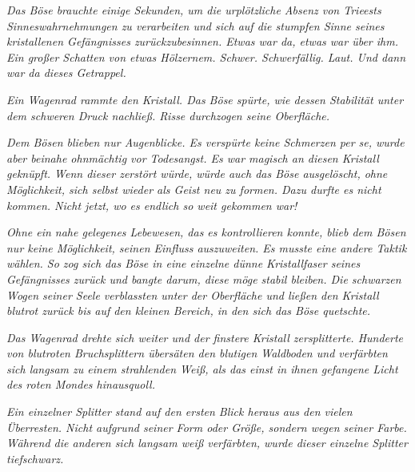 \textit{Das Böse brauchte einige Sekunden, um die urplötzliche Absenz von Trieests Sinneswahrnehmungen zu verarbeiten und sich auf die stumpfen Sinne seines kristallenen Gefängnisses zurückzubesinnen. Etwas war da, etwas war über ihm. Ein großer Schatten von etwas Hölzernem. Schwer. Schwerfällig. Laut. Und dann war da dieses Getrappel.}

\textit{Ein Wagenrad rammte den Kristall. Das Böse spürte, wie dessen Stabilität unter dem schweren Druck nachließ. Risse durchzogen seine Oberfläche.}

\textit{Dem Bösen blieben nur Augenblicke. Es verspürte keine Schmerzen per se, wurde aber beinahe ohnmächtig vor Todesangst. Es war magisch an diesen Kristall geknüpft. Wenn dieser zerstört würde, würde auch das Böse ausgelöscht, ohne Möglichkeit, sich selbst wieder als Geist neu zu formen. Dazu durfte es nicht kommen. Nicht jetzt, wo es endlich so weit gekommen war!}

\textit{Ohne ein nahe gelegenes Lebewesen, das es kontrollieren konnte, blieb dem Bösen nur keine Möglichkeit, seinen Einfluss auszuweiten. Es musste eine andere Taktik wählen. So zog sich das Böse in eine einzelne dünne Kristallfaser seines Gefängnisses zurück und bangte darum, diese möge stabil bleiben. Die schwarzen Wogen seiner Seele verblassten unter der Oberfläche und ließen den Kristall blutrot zurück bis auf den kleinen Bereich, in den sich das Böse quetschte.}

\textit{Das Wagenrad drehte sich weiter und der finstere Kristall zersplitterte. Hunderte von blutroten Bruchsplittern übersäten den blutigen Waldboden und verfärbten sich langsam zu einem strahlenden Weiß, als das einst in ihnen gefangene Licht des roten Mondes hinausquoll.}

\textit{Ein einzelner Splitter stand auf den ersten Blick heraus aus den vielen Überresten. Nicht aufgrund seiner Form oder Größe, sondern wegen seiner Farbe. Während die anderen sich langsam weiß verfärbten, wurde dieser einzelne Splitter tiefschwarz.}





























